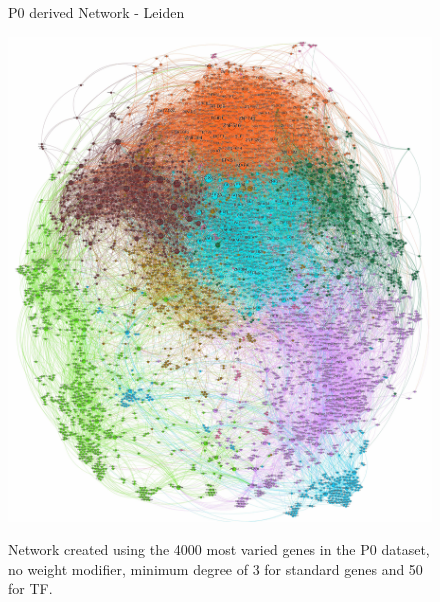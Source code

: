 \newpage
{}
\begin{figure}[p]
  \thispagestyle{empty} %
  \centering
  \captionsetup{justification=centering, labelfont=bf}
    \parbox{\textwidth}{\centering \Huge P0 derived Network - Leiden\vspace{0.5cm} } %
    \label{fig:N_I:tum_P0}
    \includegraphics[width=0.9\paperwidth,keepaspectratio]{Sections/Network_pages/images/p0_std_4K_50TF_lowRes.jpg} %
    \parbox{0.8\textwidth}{Network created using the 4000 most varied genes in the P0 dataset, no weight modifier, minimum degree of 3 for standard genes and 50 for TF.}
\end{figure}
\restoregeometry
\newpage
